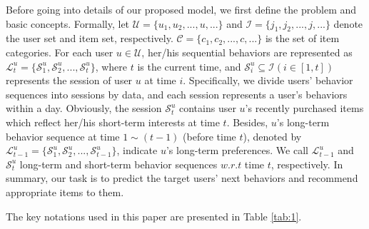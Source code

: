\documentclass[preprint,12pt]{elsarticle}
\begin{document}
\begin{sloppypar}
Before going into details of our proposed model, we first define the problem and basic concepts. Formally, let $\mathcal{U} = \{u_1,u_2,...,u,...\}$ and $\mathcal{I} = \{j_1,j_2,...,j,...\}$ denote the user set and item set, respectively. $\mathcal{C} = \{c_1,c_2,...,c,...\}$ is the set of item categories. For each user $u\in \mathcal{U}$, her/his sequential behaviors are represented as $ \mathcal{L}^u_t = \{\mathcal{S}^{u}_1, \mathcal{S}^{u}_2,..., \mathcal{S}^{u}_t\} $, where $t$ is the current time, and $ \mathcal{S}^{u}_i \subseteq \mathcal{I} (i\in [1,t]) $ represents the session of user $u$ at time $i$. Specifically, we divide users' behavior sequences into sessions by data, and each session represents a user's behaviors within a day. Obviously, the session $ \mathcal{S}^{u}_t $ contains user $u$'s recently purchased items which reflect her/his short-term interests at time $t$. Besides, $u$'s long-term behavior sequence at time $1\sim (t-1)$ (before time $t$), denoted by $ \mathcal{L}^{u}_{t-1} = \{\mathcal{S}^{u}_1,  \mathcal{S}^{u}_2, ...,  \mathcal{S}^{u}_{t-1}\}$, indicate $u$'s long-term preferences. We call $ \mathcal{L}^{u}_{t-1} $ and $ \mathcal{S}^{u}_t $ long-term and short-term behavior sequences $w.r.t$ time $t$, respectively. In summary, our task is to predict the target users' next behaviors and recommend appropriate items to them.

The key notations used in this paper are presented in Table \ref{tab:1}.


\end{sloppypar}
\end{document}
